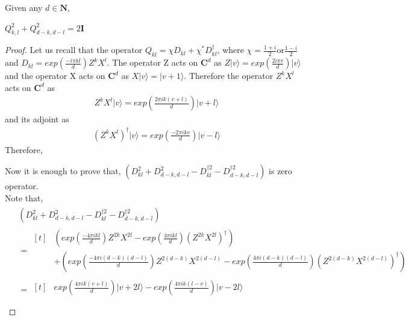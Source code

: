 \documentclass[10pt,a4paper]{amsart}
\begin{document}
\begin{proposition} \label{p1} Given any $d \in \mathbf{N}$, \\
   \begin{center}
 $ Q_{k,l}^2 + Q_{d-k,d-l}^2 = 2 \mathbf{I}$
\end{center}
\end{proposition}  

\begin{proof}
    Let us recall that the operator $Q_{kl}=\chi D_{kl}+\chi^{*} D^{\dagger}_{kl}$, where $\chi=\frac{1+i}{2} \text{or} \frac{1-i}{2}$ and $D_{kl}=exp\left(\frac{-i \pi k l }{d}\right) Z^{k} X^{l}$. The operator Z acts on $\mathbf{C}^d$ as $Z \vert v \rangle = exp\left(\frac{2i \pi v}{d} \right)\vert v \rangle$ and the operator X  acts on $\mathbf{C}^d$ as $X \vert v \rangle = \vert v+1 \rangle.$ Therefore the operator $Z^{k}X^{l}$ acts on $\mathbf{C}^d$ as 
\begin{eqnarray*}
    Z^{k}X^{l} \vert v \rangle = exp \left( \frac{2 \pi i k (v+l)}{d}\right) \vert v + l \rangle
\end{eqnarray*}
and its adjoint as 
\begin{eqnarray*}
    \left(Z^{k}X^{l}\right)^{\dagger} \vert v \rangle = exp \left( \frac{-2 \pi i k v}{d}\right) \vert v - l \rangle
\end{eqnarray*}
Therefore,

Now it is enough to prove that, $\left(D^2_{kl}+D^2_{d-k,d-l}-D^{\dagger2}_{kl}-D^{\dagger2}_{d-k,d-l}\right)$ is zero operator.\\
Note that, 
\begin{eqnarray*}
    \begin{split}
        &\left(D^2_{kl}+D^2_{d-k,d-l}-D^{\dagger2}_{kl}-D^{\dagger2}_{d-k,d-l}\right)\\
        &=\begin{aligned}[t]
        &\left(exp \left( \frac{-4 \pi i k l}{d}\right) Z^{2k}X^{2l} -exp \left( \frac{4 \pi i k l}{d}\right) (Z^{2k}X^{2l})^{\dagger}\right)\\
        &+\left(exp \left( \frac{-4 \pi i(d-k)(d-l)}{d}\right) Z^{2(d-k)}X^{2(d-l)}-exp \left( \frac{4 \pi i (d-k)(d-l)}{d}\right) (Z^{2(d-k)}X^{2(d-l)})^{\dagger}\right)
        \end{aligned}\\
        &=\begin{aligned}[t]
        &exp \left( \frac{4 \pi ik(v+l)}{d}\right) \vert v+2 l \rangle-exp \left( \frac{4 \pi ik(l-v)}{d}\right) \vert v-2 l  \rangle \\

\end{aligned}
\end{split}
\end{eqnarray*}
\end{proof}
\end{document}
